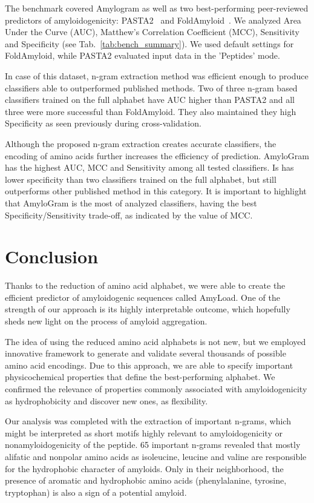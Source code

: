 \documentclass{bioinfo}
\begin{document}
The benchmark covered Amylogram as well as two best-performing peer-reviewed 
predictors of amyloidogenicity: PASTA2~\citep{walsh_pasta_2014} and 
FoldAmyloid~\citep{garbuzynskiy_foldamyloid:_2010}. We analyzed Area Under the 
Curve (AUC), Matthew's Correlation Coefficient (MCC), Sensitivity and 
Specificity (see Tab.~\ref{tab:bench_summary}). We used default settings for FoldAmyloid, 
while PASTA2 evaluated input data in the 'Peptides' mode.
    
  In case of this dataset, n-gram extraction method was efficient enough to produce 
classifiers able to outperformed published methods. Two of three n-gram based 
classifiers trained on the full alphabet have AUC higher than PASTA2 and all 
three were more successful than FoldAmyloid. They also maintained they high 
Specificity as seen previously during cross-validation.
    
  Although the proposed n-gram extraction creates accurate classifiers, the 
encoding of amino acids further increases the efficiency of prediction. 
AmyloGram has the highest AUC, MCC and Sensitivity among all tested classifiers. 
Is has lower specificity than two classifiers trained on the full alphabet, but 
still outperforms other published method in this category. It is important to 
highlight that AmyloGram is the most  of analyzed classifiers, having 
the best Specificity/Sensitivity trade-off, as indicated by the value of MCC.

\section{Conclusion}

Thanks to the reduction of amino acid alphabet, we were able to create the 
efficient predictor of amyloidogenic sequences called AmyLoad. One of the 
strength of our approach is its highly interpretable outcome, which hopefully 
sheds new light on the process of amyloid aggregation.

  The idea of using the reduced amino acid alphabets is not new, but we employed 
innovative framework to generate and validate several thousands of possible 
amino acid encodings. Due to this approach, we are able to specify important 
physicochemical properties that define the best-performing alphabet.  We 
confirmed the relevance of properties commonly associated with amyloidogenicity 
as hydrophobicity and discover new ones, as flexibility.  

  Our analysis was completed with the extraction of important n-grams, which 
might be interpreted as short motifs highly relevant to amyloidogenicity or 
nonamyloidogenicity of the peptide. 65 important n-grams revealed that mostly 
alifatic and nonpolar amino acids as isoleucine, leucine and valine are 
responsible for the hydrophobic character of amyloids. Only in their 
%
%
%
neighborhood, the presence of aromatic and hydrophobic amino acids 
(phenylalanine, tyrosine, tryptophan) is also a sign of a potential amyloid. 
\end{document}
